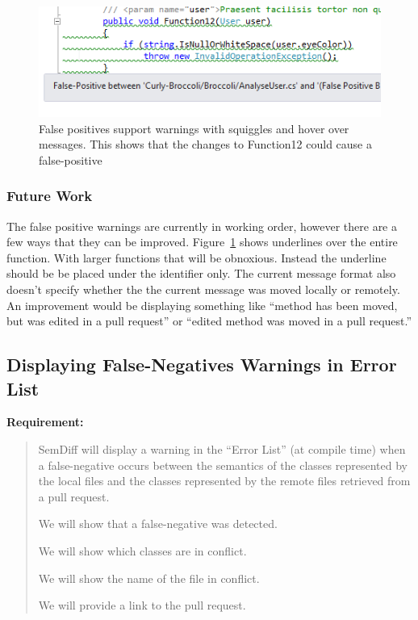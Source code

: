 \documentclass[draftclsnofoot,onecolumn]{IEEEtran}
\begin{document}
\begin{figure}[!htb]
\centering
\includegraphics[scale=1]{FalsePositiveHoverOver}
\caption{False positives support warnings with squiggles and hover over 
messages. This shows that the changes to Function12 could cause a 
false-positive}
\label{fphoverover}
\end{figure}

\subsubsection{Future Work}

The false positive warnings are currently in working order, however there are a 
few ways that they can be improved. Figure~\ref{fphoverover} shows underlines 
over the entire function. With larger functions that will be obnoxious. Instead 
the underline should be be placed under the identifier only. The current 
message format also doesn’t specify whether the the current message was moved 
locally or remotely. An improvement would be displaying something like “method 
has been moved, but was edited in a pull request” or “edited method was moved 
in a pull request.”

\subsection{Displaying False-Negatives Warnings in Error List}%

\textbf{Requirement:}

\begin{quote}

SemDiff will display a warning in the “Error List” (at compile time) when a 
false-negative occurs between the semantics of the classes represented by the 
local files and the classes represented by the remote files retrieved from a 
pull request.

We will show that a false-negative was detected.

We will show which classes are in conflict.

We will show the name of the file in conflict.

We will provide a link to the pull request.

\end{quote}
\end{document}
